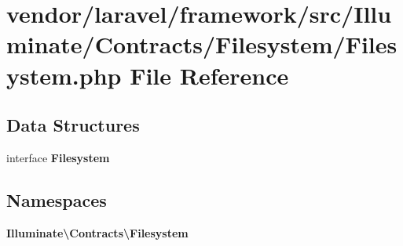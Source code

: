 \section{vendor/laravel/framework/src/\+Illuminate/\+Contracts/\+Filesystem/\+Filesystem.php File Reference}
\label{laravel_2framework_2src_2_illuminate_2_contracts_2_filesystem_2_filesystem_8php}
\subsection*{Data Structures}
\begin{DoxyCompactItemize}
\item 
interface {\bf Filesystem}
\end{DoxyCompactItemize}
\subsection*{Namespaces}
\begin{DoxyCompactItemize}
\item 
 {\bf Illuminate\textbackslash{}\+Contracts\textbackslash{}\+Filesystem}
\end{DoxyCompactItemize}

